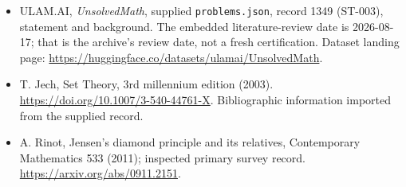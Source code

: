 \documentclass[11pt,a4paper]{article}
\begin{document}
{\small

\begin{itemize}

\item[\hypertarget{source:1349:1}{S1}] ULAM.AI, \emph{UnsolvedMath}, supplied \texttt{problems.json}, record 1349 (ST-003), statement and background. The embedded literature-review date is 2026-08-17; that is the archive’s review date, not a fresh certification. Dataset landing page: \url{https://huggingface.co/datasets/ulamai/UnsolvedMath}.

\item[\hypertarget{source:1349:2}{S2}] T. Jech, Set Theory, 3rd millennium edition (2003). \url{https://doi.org/10.1007/3-540-44761-X}. Bibliographic information imported from the supplied record.

\item[R1] A. Rinot, Jensen’s diamond principle and its relatives, Contemporary Mathematics 533 (2011); inspected primary survey record.
\url{https://arxiv.org/abs/0911.2151}.
\end{itemize}

}

\label{end:1349}
\end{document}
